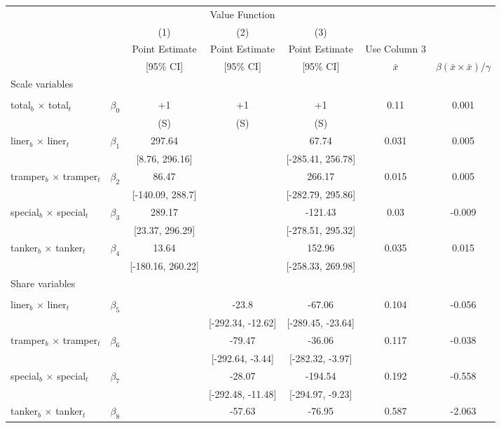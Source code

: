 \begin{tabular}{@{\extracolsep{5pt}}lcccccc}
\toprule 
 &  &  & Value Function &  &  &  \\
 &  & (1) & (2) & (3) &  &  \\
 &  & Point Estimate & Point Estimate & Point Estimate & Use Column 3 &  \\
 &  & [95\% CI] & [95\% CI] & [95\% CI] & $\bar{x}$  & $\beta(\bar{x}\times\bar{x})/\gamma$ \\
\midrule 
Scale variables &  &  &  &  &  &  \\
 &  &  &  &  &  \\
total$_{b}$ $\times$ total$_{t}$ & $\beta_0$ & +1 & +1 & +1 & 0.11 & 0.001 \\
 &  & (S) & (S) & (S) &  &  \\
liner$_{b}$ $\times$ liner$_{t}$ & $\beta_1$ & 297.64 &  & 67.74 & 0.031 & 0.005 \\
 &  & [8.76, 296.16] &  & [-285.41, 256.78] &  &  \\
tramper$_{b}$ $\times$ tramper$_{t}$ & $\beta_2$ & 86.47 &  & 266.17 & 0.015 & 0.005 \\
 &  & [-140.09, 288.7] &  & [-282.79, 295.86] &  &  \\
special$_{b}$ $\times$ special$_{t}$ & $\beta_3$ & 289.17 &  & -121.43 & 0.03 & -0.009 \\
 &  & [23.37, 296.29] &  & [-278.51, 295.32] &  &  \\
tanker$_{b}$ $\times$ tanker$_{t}$ & $\beta_4$ & 13.64 &  & 152.96 & 0.035 & 0.015 \\
 &  & [-180.16, 260.22] &  & [-258.33, 269.98] &  &  \\
Share variables &  &  &  &  &  &  \\
 &  &  &  &  &  &  \\
liner$_{b}$ $\times$ liner$_{t}$ & $\beta_5$ &  & -23.8 & -67.06 & 0.104 & -0.056 \\
 &  &  & [-292.34, -12.62] & [-289.45, -23.64] &  &  \\
tramper$_{b}$ $\times$ tramper$_{t}$ & $\beta_6$ &  & -79.47 & -36.06 & 0.117 & -0.038 \\
 &  &  & [-292.64, -3.44] & [-282.32, -3.97] &  &  \\
special$_{b}$ $\times$ special$_{t}$ & $\beta_7$ &  & -28.07 & -194.54 & 0.192 & -0.558 \\
 &  &  & [-292.48, -11.48] & [-294.97, -9.23] &  &  \\
tanker$_{b}$ $\times$ tanker$_{t}$ & $\beta_8$ &  & -57.63 & -76.95 & 0.587 & -2.063 \\

\end{tabular}
